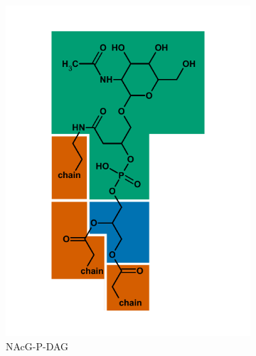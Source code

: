 {\begin{figure}[h]
    \begin{subfigure}[b]{.3\linewidth}
    	\includegraphics[width=\linewidth]{figs_ch1/NAcG-P-DAG}
    	\caption{NAcG-P-DAG}
        \label{fig:NAcG-P-DAG}
    \end{subfigure}
    \begin{subfigure}[b]{.3\linewidth}

\end{subfigure}
\end{figure}}
